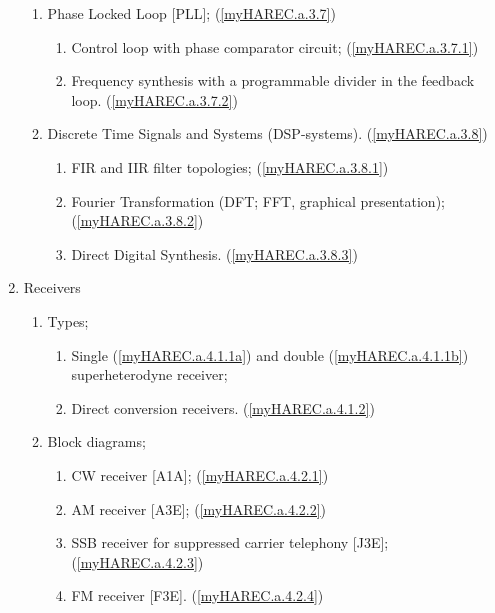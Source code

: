 \begin{enumerate}
\begin{enumerate}
\item Phase Locked Loop [PLL]; (\ref{myHAREC.a.3.7})\label{HAREC.a.3.7}
\begin{enumerate}
\item Control loop with phase comparator circuit;
  (\ref{myHAREC.a.3.7.1})\label{HAREC.a.3.7.1}
\item Frequency synthesis with a programmable divider in the feedback loop.
  (\ref{myHAREC.a.3.7.2})\label{HAREC.a.3.7.2}
\end{enumerate}

\item Discrete Time Signals and Systems (DSP-systems).
  (\ref{myHAREC.a.3.8})\label{HAREC.a.3.8}
\begin{enumerate}
\item FIR and IIR filter topologies;
  (\ref{myHAREC.a.3.8.1})\label{HAREC.a.3.8.1}
\item Fourier Transformation (DFT; FFT, graphical presentation);
  (\ref{myHAREC.a.3.8.2})\label{HAREC.a.3.8.2}
\item Direct Digital Synthesis. (\ref{myHAREC.a.3.8.3})\label{HAREC.a.3.8.3}
\end{enumerate}
\end{enumerate}

\item Receivers
\begin{enumerate}

\item Types;
\begin{enumerate}
\item Single (\ref{myHAREC.a.4.1.1a})\label{HAREC.a.4.1.1a}
  and double (\ref{myHAREC.a.4.1.1b})\label{HAREC.a.4.1.1b}
  superheterodyne receiver;
\item Direct conversion receivers. (\ref{myHAREC.a.4.1.2})\label{HAREC.a.4.1.2}
\end{enumerate}

\item Block diagrams;
\begin{enumerate}
\item CW receiver [A1A]; (\ref{myHAREC.a.4.2.1})\label{HAREC.a.4.2.1}
\item AM receiver [A3E]; (\ref{myHAREC.a.4.2.2})\label{HAREC.a.4.2.2}
\item SSB receiver for suppressed carrier telephony [J3E];
  (\ref{myHAREC.a.4.2.3})\label{HAREC.a.4.2.3}
\item FM receiver [F3E]. (\ref{myHAREC.a.4.2.4})\label{HAREC.a.4.2.4}
\end{enumerate}


\end{enumerate}
\end{enumerate}
